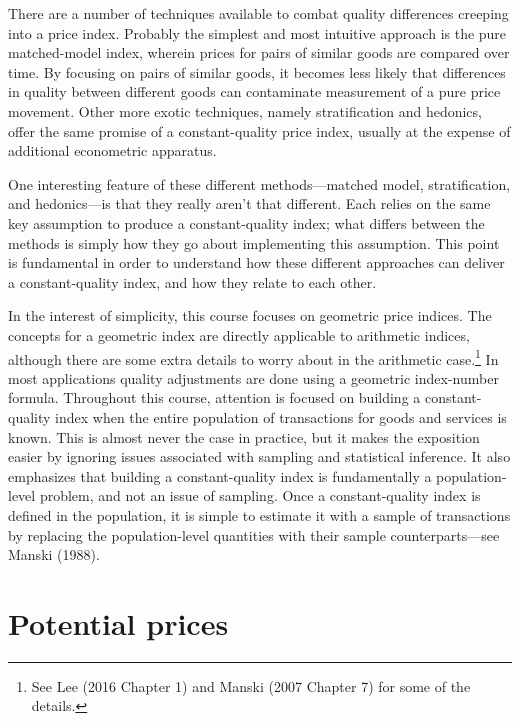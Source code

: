 \documentclass[]{article}
\begin{document}
There are a number of techniques available to combat quality differences creeping into a price index. Probably the simplest and most intuitive approach is the pure matched-model index, wherein prices for pairs of similar goods are compared over time. By focusing on pairs of similar goods, it becomes less likely that differences in quality between different goods can contaminate measurement of a pure price movement. Other more exotic techniques, namely stratification and hedonics, offer the same promise of a constant-quality price index, usually at the expense of additional econometric apparatus.

One interesting feature of these different methods---matched model, stratification, and hedonics---is that they really aren't that different. Each relies on the same key assumption to produce a constant-quality index; what differs between the methods is simply how they go about implementing this assumption. This point is fundamental in order to understand how these different approaches can deliver a constant-quality index, and how they relate to each other.

In the interest of simplicity, this course focuses on geometric price indices. The concepts for a geometric index are directly applicable to arithmetic indices, although there are some extra details to worry about in the arithmetic case.\footnote{See Lee (2016 Chapter 1) and Manski (2007 Chapter 7) for some of the details.} In most applications quality adjustments are done using a geometric index-number formula. Throughout this course, attention is focused on building a constant-quality index when the entire population of transactions for goods and services is known. This is almost never the case in practice, but it makes the exposition easier by ignoring issues associated with sampling and statistical inference. It also emphasizes that building a constant-quality index is fundamentally a population-level problem, and not an issue of sampling. Once a constant-quality index is defined in the population, it is simple to estimate it with a sample of transactions by replacing the population-level quantities with their sample counterparts---see Manski (1988).

\hypertarget{potential-prices}{%
\section{Potential prices}\label{potential-prices}}
\end{document}
